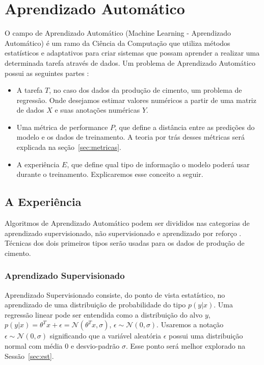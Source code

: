 \section{Aprendizado Automático}
\label{sec:aprenauto}
O campo de Aprendizado Automático (Machine Learning - Aprendizado Automático) é um ramo da Ciência
da Computação que utiliza métodos estatísticos e adaptativos para criar sistemas que possam
aprender a realizar uma determinada tarefa através de dados. Um problema de Aprendizado Automático possui
as seguintes partes \citep{dlbook}: \\

\begin{itemize}

  
\item A tarefa $T$, no caso dos dados da produção de cimento, um problema de regressão.
  Onde desejamos estimar valores numéricos a partir de uma matriz de dados $X$ e
  suas anotações numéricas $Y$. 
  
\item Uma métrica de performance $P$, que define a distância entre as predições
  do modelo e os dados de treinamento. A teoria por trás desses métricas será explicada na seção~\ref{sec:metricas}.

\item A experiência $E$, que define qual tipo de informação o modelo poderá usar
  durante o treinamento. Explicaremos esse conceito a seguir. 
  
\end{itemize}

\subsection{A Experiência}
\label{sec:exp}
Algoritmos de Aprendizado Automático podem ser divididos nas categorias de
aprendizado supervisionado, não supervisionado e aprendizado por reforço
\citep{dlbook}. Técnicas dos dois primeiros tipos serão usadas para os dados de
produção de cimento.


\subsubsection{Aprendizado Supervisionado}
\label{sec:apren} 
Aprendizado Supervisionado consiste, do ponto de vista estatístico, no
aprendizado de uma distribuição de probabilidade do tipo $p(y | x)$. Uma
regressão linear pode ser entendida como a distribuição do alvo $y$, $p(y | x) = \theta^Tx + \epsilon =
\mathcal{N}(\theta^Tx,\sigma) $, $\epsilon \sim \mathcal{N}(0,\sigma)$. Usaremos
a notação  $\epsilon \sim \mathcal{N}(0,\sigma)$ significando que a variável
aleatória $\epsilon$ possui uma distribuição normal com média 0 e desvio-padrão $\sigma$.
Esse ponto será melhor explorado na Sessão~\ref{sec:est}. \\ 

